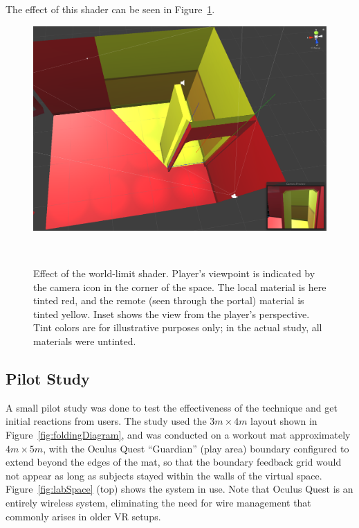 \documentclass{sigchi}
\begin{document}
The effect of this shader can be seen in Figure~\ref{fig:shaderEffect}.

\begin{figure}[htb]
  \centering
  \includegraphics[width=1\columnwidth]{figures/ShaderEffect.png}
  \caption{Effect of the world-limit shader.  Player’s viewpoint is indicated by the camera icon in the corner of the space.  The local material is here tinted red, and the remote (seen through the portal) material is tinted yellow.  Inset shows the view from the player’s perspective.  Tint colors are for illustrative purposes only; in the actual study, all materials were untinted.}~\label{fig:shaderEffect}
\end{figure}


\subsection{Pilot Study}

A small pilot study was done to test the effectiveness of the technique and get initial reactions from users.  The study used the $3 m \times 4 m$ layout shown in Figure~\ref{fig:foldingDiagram}, and was conducted on a workout mat approximately $4 m \times 5 m$, with the Oculus Quest “Guardian” (play area) boundary configured to extend beyond the edges of the mat, so that the boundary feedback grid would not appear as long as subjects stayed within the walls of the virtual space.  Figure~\ref{fig:labSpace} (top) shows the system in use.  Note that Oculus Quest is an entirely wireless system, eliminating the need for wire management that commonly arises in older VR setups.
\end{document}
